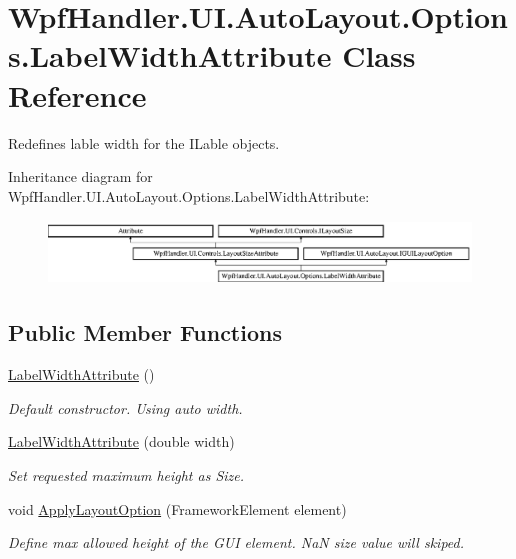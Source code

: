 \hypertarget{class_wpf_handler_1_1_u_i_1_1_auto_layout_1_1_options_1_1_label_width_attribute}{}\section{Wpf\+Handler.\+U\+I.\+Auto\+Layout.\+Options.\+Label\+Width\+Attribute Class Reference}
\label{class_wpf_handler_1_1_u_i_1_1_auto_layout_1_1_options_1_1_label_width_attribute}


Redefines lable width for the I\+Lable objects.  


Inheritance diagram for Wpf\+Handler.\+U\+I.\+Auto\+Layout.\+Options.\+Label\+Width\+Attribute\+:\begin{figure}[H]
\begin{center}
\leavevmode
\includegraphics[height=1.696970cm]{d2/d77/class_wpf_handler_1_1_u_i_1_1_auto_layout_1_1_options_1_1_label_width_attribute}
\end{center}
\end{figure}
\subsection*{Public Member Functions}
\begin{DoxyCompactItemize}
\item 
\mbox{\hyperlink{class_wpf_handler_1_1_u_i_1_1_auto_layout_1_1_options_1_1_label_width_attribute_a466768b6dfd74a49bcae860cb52ab7ab}{Label\+Width\+Attribute}} ()
\begin{DoxyCompactList}\small\item\em Default constructor. Using auto width. \end{DoxyCompactList}\item 
\mbox{\hyperlink{class_wpf_handler_1_1_u_i_1_1_auto_layout_1_1_options_1_1_label_width_attribute_a24991b7cdbc8d575106a41fd7573ad92}{Label\+Width\+Attribute}} (double width)
\begin{DoxyCompactList}\small\item\em Set requested maximum height as Size. \end{DoxyCompactList}\item 
void \mbox{\hyperlink{class_wpf_handler_1_1_u_i_1_1_auto_layout_1_1_options_1_1_label_width_attribute_ab8dae5f847875d310747599429c5054a}{Apply\+Layout\+Option}} (Framework\+Element element)
\begin{DoxyCompactList}\small\item\em Define max allowed height of the G\+UI element. NaN size value will skiped. \end{DoxyCompactList}\end{DoxyCompactItemize}
